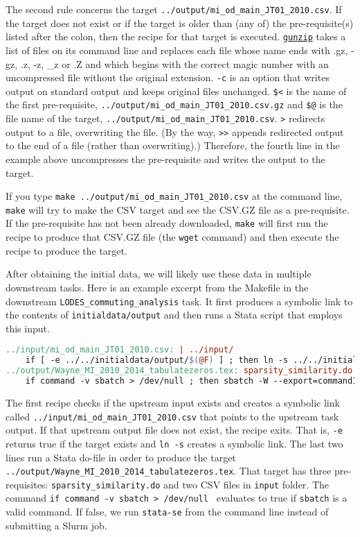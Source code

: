 The second rule concerns the target \texttt{../output/mi\_od\_main\_JT01\_2010.csv}.
If the target  does not exist or if the target is older than (any of) the pre-requisite(s) listed after the colon,
then the recipe for that target is executed.
\href{https://linux.die.net/man/1/gunzip}{\texttt{gunzip}} takes a list of files on its command line and replaces each file whose name ends with .gz, -gz, .z, -z, \_z or .Z and which begins with the correct magic number with an uncompressed file without the original extension. 
\texttt{-c} is an option that writes output on standard output and keeps original files unchanged. 
\texttt{\$<} is the name of the first pre-requisite, \texttt{../output/mi\_od\_main\_JT01\_2010.csv.gz} and \texttt{\$@} is the file name of the target, \texttt{../output/mi\_od\_main\_JT01\_2010.csv}.
\texttt{>} redirects output to a file, overwriting the file. 
(By the way, \texttt{>>} appends redirected output to the end of a file (rather than overwriting).) 
Therefore, the fourth line in the example above uncompresses the pre-requisite and writes the output to the target.

If you type \texttt{make ../output/mi\_od\_main\_JT01\_2010.csv} at the command line, \texttt{make} will try to make the CSV target and see the CSV.GZ file as a pre-requisite. 
If the pre-requisite has not been already downloaded, \texttt{make} will first run the recipe to produce that CSV.GZ file (the \texttt{wget} command) and then execute the recipe to produce the target.

After obtaining the initial data, we will likely use these data in multiple downstream tasks. 
Here is an example excerpt from the Makefile in the downstream \texttt{LODES\_commuting\_analysis} task.
It first produces a symbolic link to the contents of \texttt{initialdata/output}
and then runs a Stata script that employs this input.
\begin{lstlisting}[language=make]
../input/mi_od_main_JT01_2010.csv: | ../input/
	if [ -e ../../initialdata/output/$(@F) ] ; then ln -s ../../initialdata/output/$(@F) $@ ; else exit 1; fi
../output/Wayne_MI_2010_2014_tabulatezeros.tex: sparsity_similarity.do ../input/mi_od_main_JT01_2010.csv ../input/mi_od_main_JT01_2014.csv
	if command -v sbatch > /dev/null ; then sbatch -W --export=command1='module load stata',command2='stata-se -e sparsity_similarity.do' run.sbatch; else stata-se -e sparsity_similarity.do; fi 	
\end{lstlisting}
The first recipe checks if the upstream input exists and creates a symbolic link called \texttt{../input/mi\_od\_main\_JT01\_2010.csv} that points to the upstream task output.
If that upstream output file does not exist, the recipe exits.
That is, \texttt{-e} returns true if the target exists and \texttt{ln -s} creates a symbolic link.  
The last two lines run a Stata do-file in order to produce the target \texttt{../output/Wayne\_MI\_2010\_2014\_tabulatezeros.tex}.
That target has three pre-requisites: \texttt{sparsity\_similarity.do} and two CSV files in \texttt{input} folder.
The command \texttt{if command -v sbatch > /dev/null } evaluates to true if \texttt{sbatch} is a valid command.
If false, we run \texttt{stata-se} from the command line instead of submitting a Slurm job.
